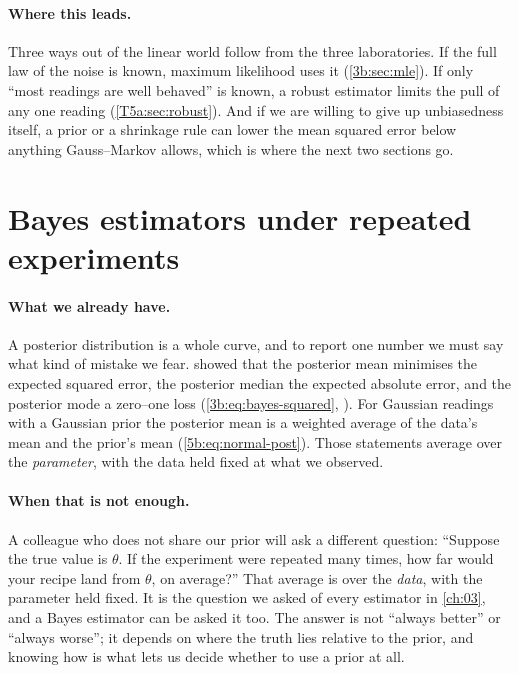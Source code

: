 \paragraph{Where this leads.}
Three ways out of the linear world follow from the three laboratories. If
the full law of the noise is known, maximum likelihood uses it
(\cref{3b:sec:mle}). If only ``most readings are well behaved'' is known, a
robust estimator limits the pull of any one reading (\cref{T5a:sec:robust}).
And if we are willing to give up unbiasedness itself, a prior or a shrinkage
rule can lower the mean squared error below anything Gauss--Markov allows,
which is where the next two sections go.
\section{Bayes estimators under repeated experiments}
\label{T5a:sec:bayes-risk}

\paragraph{What we already have.}
A posterior distribution is a whole curve, and to report one number we must
say what kind of mistake we fear.  showed that
the posterior mean minimises the expected squared error, the posterior
median the expected absolute error, and the posterior mode a zero--one loss
(\cref{3b:eq:bayes-squared}, ). For Gaussian
readings with a Gaussian prior the posterior mean is a weighted average of
the data's mean and the prior's mean (\cref{5b:eq:normal-post}). Those
statements average over the \emph{parameter}, with the data held fixed at
what we observed.

\paragraph{When that is not enough.}
A colleague who does not share our prior will ask a different question:
``Suppose the true value is $\theta$. If the experiment were repeated many
times, how far would your recipe land from $\theta$, on average?'' That
average is over the \emph{data}, with the parameter held fixed. It is the
question we asked of every estimator in \cref{ch:03}, and a Bayes estimator
can be asked it too. The answer is not ``always better'' or ``always worse'';
it depends on where the truth lies relative to the prior, and knowing how
is what lets us decide whether to use a prior at all.

